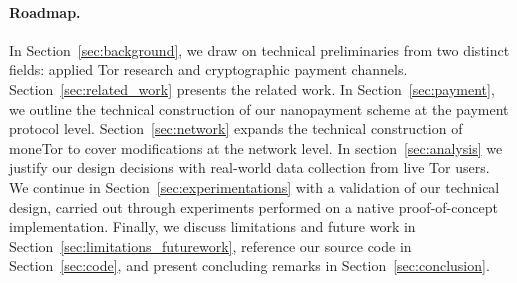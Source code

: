 \paragraph*{Roadmap.} In Section~\ref{sec:background}, we draw on technical
preliminaries from two distinct fields: applied Tor research and cryptographic
payment channels. Section~\ref{sec:related_work} presents the related work. 
In Section~\ref{sec:payment}, we outline the technical construction of
our nanopayment scheme at the payment protocol level. Section~\ref{sec:network}
expands the technical construction of moneTor to cover modifications at the
network level. In section~\ref{sec:analysis} we justify our design decisions
with real-world data collection from live Tor users. We continue in
Section~\ref{sec:experimentations} with a validation of our technical design,
carried out through experiments performed on a native proof-of-concept
implementation. Finally, we discuss limitations and future work in
Section~\ref{sec:limitations_futurework}, reference our source code in
Section~\ref{sec:code}, and present concluding remarks in
Section~\ref{sec:conclusion}.

